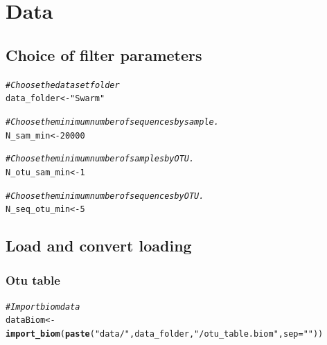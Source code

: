 \documentclass[12pt]{article}\usepackage[]{graphicx}\usepackage[]{color}
\makeatletter
\newcommand{\hlnum}[1]{\textcolor[rgb]{0.686,0.059,0.569}{#1}}%
\newcommand{\hlstr}[1]{\textcolor[rgb]{0.192,0.494,0.8}{#1}}%
\newcommand{\hlcom}[1]{\textcolor[rgb]{0.678,0.584,0.686}{\textit{#1}}}%
\newcommand{\hlstd}[1]{\textcolor[rgb]{0.345,0.345,0.345}{#1}}%
\newcommand{\hlkwb}[1]{\textcolor[rgb]{0.69,0.353,0.396}{#1}}%
\newcommand{\hlkwc}[1]{\textcolor[rgb]{0.333,0.667,0.333}{#1}}%
\newcommand{\hlkwd}[1]{\textcolor[rgb]{0.737,0.353,0.396}{\textbf{#1}}}%
\newenvironment{kframe}{%
 \def\at@end@of@kframe{}%
 \ifinner\ifhmode%
  \def\at@end@of@kframe{\end{minipage}}%
  \begin{minipage}{\columnwidth}%
 \fi\fi%
 \def\FrameCommand##1{\hskip\@totalleftmargin \hskip-\fboxsep
 \colorbox{shadecolor}{##1}\hskip-\fboxsep
     \hskip-\linewidth \hskip-\@totalleftmargin \hskip\columnwidth}%
 \MakeFramed {\advance\hsize-\width
   \@totalleftmargin\z@ \linewidth\hsize
   \@setminipage}}%
 {\par\unskip\endMakeFramed%
 \at@end@of@kframe}
\newenvironment{knitrout}{}{} %
\numberwithin{figure}{section}
\makeatother
\begin{document}
\section{Data}

  \subsection{Choice of filter parameters}
  \label{section:filter}
\begin{knitrout}\small
{}\color{fgcolor}\begin{kframe}
\begin{alltt}
\hlcom{#Choose the dataset folder}
\hlstd{data_folder} \hlkwb{<-} \hlstr{"Swarm"}

\hlcom{#Choose the minimum number of sequences by sample.}
\hlstd{N_sam_min} \hlkwb{<-} \hlnum{20000}

\hlcom{#Choose the minimum number of samples by OTU.}
\hlstd{N_otu_sam_min} \hlkwb{<-} \hlnum{1}

\hlcom{#Choose the minimum number of sequences by OTU.}
\hlstd{N_seq_otu_min} \hlkwb{<-} \hlnum{5}
\end{alltt}
\end{kframe}
\end{knitrout}


  \subsection{Load and convert loading}
  \subsubsection{Otu table}
\begin{knitrout}\small
{}\color{fgcolor}\begin{kframe}
\begin{alltt}
\hlcom{#Import biom data}
\hlstd{dataBiom}   \hlkwb{<-} \hlkwd{import_biom}\hlstd{(}\hlkwd{paste}\hlstd{(}\hlstr{"data/"}\hlstd{, data_folder,} \hlstr{"/otu_table.biom"}\hlstd{,} \hlkwc{sep}\hlstd{=}\hlstr{""}\hlstd{))}
\end{alltt}
\end{kframe}
\end{knitrout}
\end{document}
